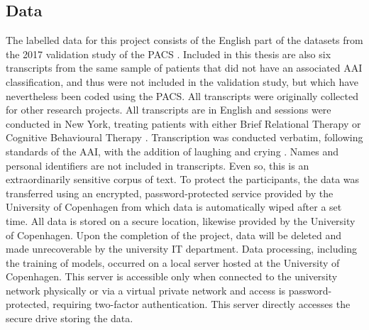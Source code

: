 \documentclass[12pt]{report}
\begin{document}
\subsection{Data}
The labelled data for this project consists of the English part of the datasets from the 2017 validation study of the PACS \cite{Talia2017}.
Included in this thesis are also six transcripts from the same sample of patients that did not have an associated AAI classification, and thus were not included in the validation study, but which have nevertheless been coded using the PACS.
All transcripts were originally collected for other research projects.
All transcripts are in English and sessions were conducted in New York, treating patients with either Brief Relational Therapy \cite{Safran2000} or Cognitive Behavioural Therapy \cite{Beck2011}.
Transcription was conducted verbatim, following standards of the AAI, with the addition of laughing and crying \cite{Talia2017, Talia2014}.
Names and personal identifiers are not included in transcripts.
Even so, this is an extraordinarily sensitive corpus of text.
To protect the participants, the data was transferred using an encrypted, password-protected service provided by the University of Copenhagen from which data is automatically wiped after a set time.
All data is stored on a secure location, likewise provided by the University of Copenhagen.
Upon the completion of the project, data will be deleted and made unrecoverable by the university IT department.
Data processing, including the training of models, occurred on a local server hosted at the University of Copenhagen.
This server is accessible only when connected to the university network physically or via a virtual private network and access is password-protected, requiring two-factor authentication.
This server directly accesses the secure drive storing the data.
\end{document}
